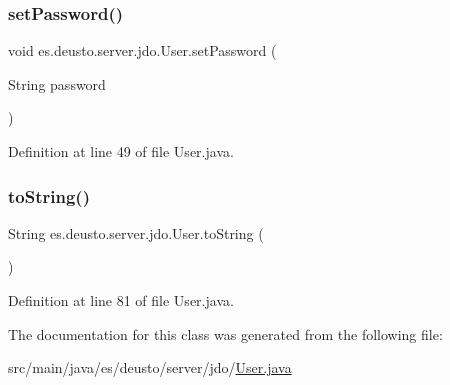 \subsubsection{\texorpdfstring{set\+Password()}{setPassword()}}
{\footnotesize\ttfamily void es.\+deusto.\+server.\+jdo.\+User.\+set\+Password (\begin{DoxyParamCaption}\item[{String}]{password }\end{DoxyParamCaption})}



Definition at line 49 of file User.\+java.

\mbox{\label{classes_1_1deusto_1_1server_1_1jdo_1_1_user_a65366a578a6dcc53e3a77d6eabbbf8cf}} 
\subsubsection{\texorpdfstring{to\+String()}{toString()}}
{\footnotesize\ttfamily String es.\+deusto.\+server.\+jdo.\+User.\+to\+String (\begin{DoxyParamCaption}{ }\end{DoxyParamCaption})}



Definition at line 81 of file User.\+java.



The documentation for this class was generated from the following file\+:\begin{DoxyCompactItemize}
\item 
src/main/java/es/deusto/server/jdo/\hyperlink{_user_8java}{User.\+java}\end{DoxyCompactItemize}
